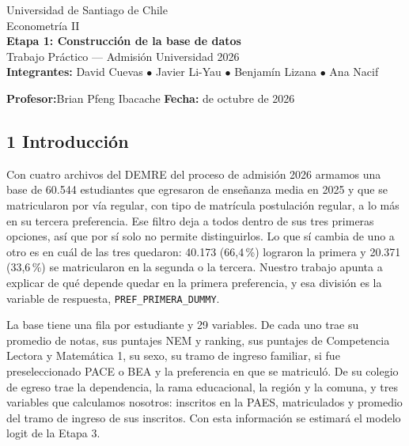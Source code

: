 \documentclass[11pt]{article}
\begin{document}
\sloppy

\begin{titlepage}
\centering
\vspace*{3cm}
{\large Universidad de Santiago de Chile}\\[6pt]
{\large Econometría II}\\[2cm]
{\LARGE \textbf{Etapa 1: Construcción de la base de datos}}\\[10pt]
{\large Trabajo Práctico --- Admisión Universidad 2026}\\[3cm]

\textbf{Integrantes:}\quad
David Cuevas $\bullet$ Javier Li-Yau $\bullet$ Benjamín Lizana $\bullet$ Ana Nacif

\vspace{0.6cm}

\textbf{Profesor:}\quad Brian Pfeng Ibacache
\qquad
\textbf{Fecha:} de octubre de 2026
\end{titlepage}

\subsection*{1 \; Introducción}

Con cuatro archivos del DEMRE del proceso de admisión 2026 armamos una
base de 60.544 estudiantes que egresaron de enseñanza media en 2025 y
que se matricularon por vía regular, con tipo de matrícula postulación
regular, a lo más en su tercera preferencia. Ese filtro deja a todos
dentro de sus tres primeras opciones, así que por sí solo no permite
distinguirlos. Lo que sí cambia de uno a otro es en cuál de las tres
quedaron: 40.173 (66,4\,\%) lograron la primera y 20.371 (33,6\,\%) se
matricularon en la segunda o la tercera. Nuestro trabajo apunta a
explicar de qué depende quedar en la primera preferencia, y esa división
es la variable de respuesta, \texttt{PREF\_PRIMERA\_DUMMY}.

La base tiene una fila por estudiante y 29 variables. De cada uno trae
su promedio de notas, sus puntajes NEM y ranking, sus puntajes de
Competencia Lectora y Matemática 1, su sexo, su tramo de ingreso
familiar, si fue preseleccionado PACE o BEA y la preferencia en que se
matriculó. De su colegio de egreso trae la dependencia, la rama
educacional, la región y la comuna, y tres variables que calculamos
nosotros: inscritos en la PAES, matriculados y promedio del tramo de
ingreso de sus inscritos. Con esta información se estimará el modelo
logit de la Etapa 3.
\end{document}
